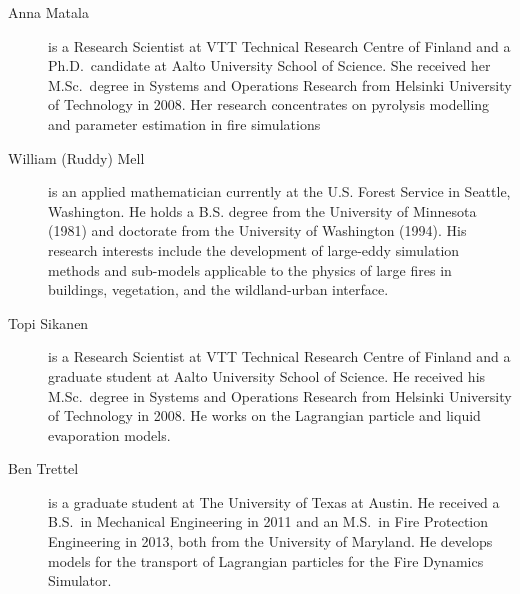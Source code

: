 \begin{description}

\item[Anna Matala] is a Research Scientist at VTT Technical Research Centre of Finland and a Ph.D.~candidate at Aalto University School of Science. She received her M.Sc.~degree in Systems and Operations Research from Helsinki University of Technology in 2008. Her research concentrates on pyrolysis modelling and parameter estimation in fire simulations

\item[William (Ruddy) Mell] is an applied mathematician currently at the U.S. Forest Service in Seattle, Washington. He holds a B.S. degree from the University of Minnesota (1981) and doctorate from the University of Washington (1994). His research interests include the development of large-eddy simulation methods and sub-models applicable to the physics of large fires in buildings, vegetation, and the wildland-urban interface.

\item[Topi Sikanen] is a Research Scientist at VTT Technical Research Centre of Finland and a graduate student at Aalto University School of Science. He received his M.Sc.~degree in Systems and Operations Research from Helsinki University of Technology in 2008. He works on the Lagrangian particle and liquid evaporation models.

\item[Ben Trettel] is a graduate student at The University of Texas at Austin. He received a B.S.~in Mechanical Engineering in 2011 and an M.S.~in Fire Protection Engineering in 2013, both from the University of Maryland. He develops models for the transport of Lagrangian particles for the Fire Dynamics Simulator.


\end{description}


